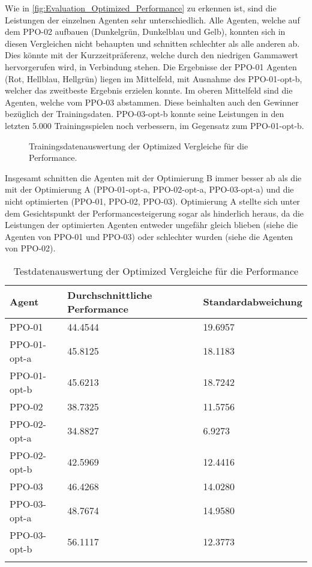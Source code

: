 Wie in \autoref{fig:Evaluation_Optimized_Performance} zu erkennen ist, sind die Leistungen der einzelnen Agenten sehr unterschiedlich. Alle Agenten, welche auf dem PPO-02 aufbauen (Dunkelgrün, Dunkelblau und Gelb), konnten sich in diesen Vergleichen nicht behaupten und schnitten schlechter als alle anderen ab. Dies könnte mit der Kurzzeitpräferenz, welche durch den niedrigen Gammawert hervorgerufen wird, in Verbindung stehen. Die Ergebnisse der PPO-01 Agenten (Rot, Hellblau, Hellgrün) liegen im Mittelfeld, mit Ausnahme des PPO-01-opt-b, welcher das zweitbeste Ergebnis erzielen konnte. Im oberen Mittelfeld sind die Agenten, welche vom PPO-03 abstammen. Diese beinhalten auch den Gewinner bezüglich der Trainingsdaten. PPO-03-opt-b konnte seine Leistungen in den letzten 5.000 Trainingsspielen noch verbessern, im Gegensatz zum PPO-01-opt-b.
\begin{figure}[H]
	\centering
	
	\caption[Performance - Auswertung der Trainingsdaten der Optimized Vergleiche]{Trainingsdatenauswertung der Optimized Vergleiche für die Performance.}
	\label{fig:Evaluation_Optimized_Performance}
\end{figure}
Insgesamt schnitten die Agenten mit der Optimierung B immer besser ab als die mit der Optimierung A (PPO-01-opt-a, PPO-02-opt-a, PPO-03-opt-a) und die nicht optimierten (PPO-01, PPO-02, PPO-03). Optimierung A stellte sich unter dem Gesichtspunkt der Performancesteigerung sogar als hinderlich heraus, da die Leistungen der optimierten Agenten entweder ungefähr gleich blieben (siehe die Agenten von PPO-01 und PPO-03) oder schlechter wurden (siehe die Agenten von PPO-02).
\begin{longtable}[h]{|p{4.5cm}|p{4.5cm}|p{4.5cm}|}
	\hline
	Agent & Durchschnittliche Performance & Standardabweichung \\
	\hline
	PPO-01 & 44.4544 & 19.6957 \\ 
	\hline
	PPO-01-opt-a & 45.8125 & 18.1183 \\ 
	\hline
	PPO-01-opt-b & 45.6213 & 18.7242 \\ 
	\hline
	PPO-02 & 38.7325 & 11.5756 \\ 
	\hline
	PPO-02-opt-a & 34.8827 & 6.9273 \\ 
	\hline
	PPO-02-opt-b & 42.5969 & 12.4416 \\ 
	\hline
	PPO-03 & 46.4268 & 14.0280 \\ 
	\hline
	PPO-03-opt-a & 48.7674 & 14.9580 \\ 
	\hline
	PPO-03-opt-b & 56.1117 & 12.3773 \\ 
	\hline
	\caption{Testdatenauswertung der Optimized Vergleiche für die Performance}
	\label{tab:Evaluation_Testdaten_Performance_Optimized} 
\end{longtable}
